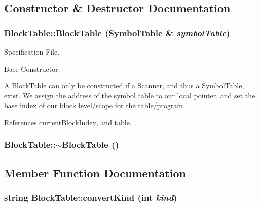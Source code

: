 \subsection{Constructor \& Destructor Documentation}
\hypertarget{classBlockTable_ab9659ed0c4fbbc10e919da0739c49e7e}{
\subsubsection[{BlockTable}]{\setlength{\rightskip}{0pt plus 5cm}BlockTable::BlockTable ({\bf SymbolTable} \& {\em symbolTable})}}
\label{classBlockTable_ab9659ed0c4fbbc10e919da0739c49e7e}


Specification File. 

Base Constructor.

A \hyperlink{classBlockTable}{BlockTable} can only be constructed if a \hyperlink{classScanner}{Scanner}, and thus a \hyperlink{classSymbolTable}{SymbolTable}, exist. We assign the address of the symbol table to our local pointer, and set the base index of our block level/scope for the table/program. 

References currentBlockIndex, and table.

\hypertarget{classBlockTable_a5a78c20a967eb659c9f424687fe17c1d}{
\subsubsection[{$\sim$BlockTable}]{\setlength{\rightskip}{0pt plus 5cm}BlockTable::$\sim$BlockTable ()}}
\label{classBlockTable_a5a78c20a967eb659c9f424687fe17c1d}


\subsection{Member Function Documentation}
\hypertarget{classBlockTable_ac9a83858d9184169f92781ef26bf603a}{
\subsubsection[{convertKind}]{\setlength{\rightskip}{0pt plus 5cm}string BlockTable::convertKind (int {\em kind})}}
\label{classBlockTable_ac9a83858d9184169f92781ef26bf603a}


